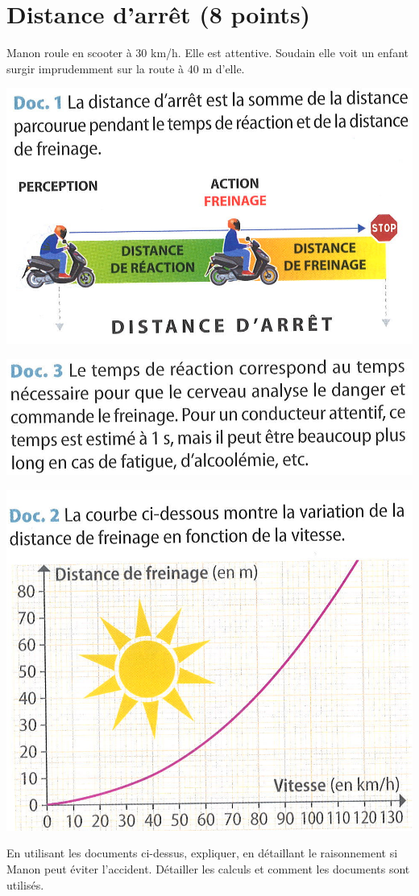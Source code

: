 \section{Distance d'arrêt (8 points)}

Manon roule en scooter à 30 km/h. Elle est attentive. Soudain elle voit un enfant surgir imprudemment sur la route à 40 m d'elle.

\begin{multicols}{2}
	\includegraphics[scale=0.3]{dist_doc1}
	
	\includegraphics[scale=0.9]{dist_doc3}
	
	
	\includegraphics[scale=0.3]{dist_doc2}		
\end{multicols}

\begin{questions}
	\question[8] En utilisant les documents ci-dessus, expliquer, en détaillant le raisonnement si Manon peut éviter l'accident.  Détailler les calculs et comment les documents sont utilisés.
	
	\fillwithdottedlines{12cm}
\end{questions}





